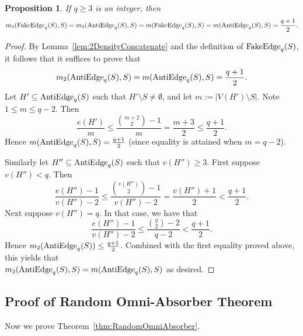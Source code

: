 \documentclass[11pt]{article}
\numberwithin{equation}{section}
\newcounter{i}
\theoremstyle{plain}
\newtheorem{proposition}[thm]{Proposition}
\theoremstyle{plain} %
\theoremstyle{definition}
\begin{document}
\begin{proposition}\label{prop:FakeEdge}
If $q\ge 3$ is an integer, then 
$$m_2({\rm Fake Edge}_q(S),S) = m_2({\rm AntiEdge}_q(S),S) = m({\rm Fake Edge}_q(S),S) = m({\rm AntiEdge}_q(S),S) = \frac{q+1}{2}.$$
\end{proposition}
\begin{proof}
By Lemma~\ref{lem:2DensityConcatenate} and the definition of ${\rm FakeEdge}_q(S)$, it follows that it suffices to prove that $$m_2({\rm AntiEdge}_q(S),S) = m({\rm AntiEdge}_q(S),S) = \frac{q+1}{2}.$$ Let $H'\subseteq {\rm AntiEdge}_q(S)$ such that $H'\setminus S\ne \emptyset$, and let $m := |V(H')\setminus S|$. Note $1\le m\le q-2$. Then
$$\frac{e(H')}{m} \le \frac{\binom{m+2}{2}-1}{m} = \frac{m+3}{2} \le \frac{q+1}{2}.$$
Hence $m({\rm AntiEdge}_q(S),S) = \frac{q+1}{2}$ (since equality is attained when $m=q-2$).

Similarly let $H''\subseteq {\rm AntiEdge}_q(S)$ such that $v(H'')\ge 3$. First suppose $v(H'')<q$. Then
$$\frac{e(H'')-1}{v(H'')-2} \le \frac{\binom{v(H'')}{2}-1}{v(H'')-2} = \frac{v(H'')+1}{2} < \frac{q+1}{2}.$$
Next suppose $v(H'')=q$. In that case, we have that
$$\frac{e(H'')-1}{v(H'')-2} \le \frac{\binom{q}{2}-2}{q-2} < \frac{q+1}{2}.$$
Hence $m_2({\rm AntiEdge}_q(S)) \le \frac{q+1}{2}$. Combined with the first equality proved above, this yields that \\
$m_2({\rm AntiEdge}_q(S),S) = m({\rm AntiEdge}_q(S),S)$ as desired.
\end{proof}



\subsection{Proof of Random Omni-Absorber Theorem}

Now we prove Theorem~\ref{thm:RandomOmniAbsorber}.
\end{document}
